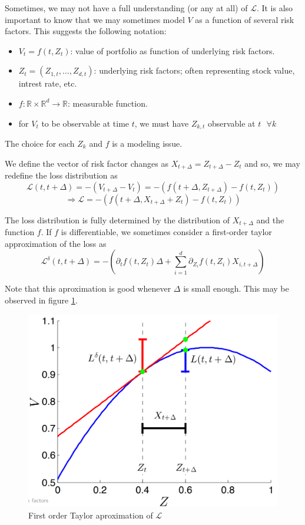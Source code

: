 Sometimes, we may not have a full understanding (or any at all) of $\mathcal{L}$. It is also important to know that we may sometimes model $V$ as a function of
several risk factors. This suggests the following notation:

\begin{itemize}
    \item $V_t = f(t, Z_t)$: value of portfolio as function of underlying risk factors.
    \item $Z_t = (Z_{1,t}, \ldots, Z_{d, t})$: underlying risk factors; often representing stock value, intrest rate, etc.
    \item $f: \mathbb{R} \times \mathbb{R}^d \rightarrow \mathbb{R}$: measurable function.
    \item for $V_t$ to be observable at time $t$, we must have $Z_{k,t}$ observable at $t \text{  } \forall k$
\end{itemize}

The choice for each $Z_k$ and $f$ is a modeling issue.

\begin{definition}
    We define the vector of risk factor changes as $X_{t + \Delta} = Z_{t + \Delta} - Z_t$ and so, we may redefine the loss distribution as
    $$\mathcal{L}(t, t + \Delta) = - \left( V_{t + \Delta} - V_t \right) = - \left( f(t + \Delta, Z_{t + \Delta}) - f(t, Z_t) \right) $$
    $$\Rightarrow \mathcal{L} = - \left( f(t + \Delta, X_{t + \Delta} + Z_t) - f(t, Z_t) \right)$$
\end{definition}

The loss distribution is fully determined by the distribution of $X_{t + \Delta}$ and the function $f$. If $f$ is differentiable, we sometimes consider a first-order taylor approximation of the loss as
$$\mathcal{L}^{\delta}(t, t + \Delta) = - \left( \partial_t f(t, Z_t) \Delta + \sum_{i=1}^{d} \partial_{Z_i} f(t, Z_i)X_{i, t + \Delta} \right)$$

\begin{remark}
    Note that this aproximation is good whenever $\Delta$ is small enough. This may be observed in figure \ref{firstorderaprox}.
\end{remark}

\begin{figure}[htbp]
\centerline{\includegraphics[scale=0.2]{figures/linear_approx_lossdistribution.png}}
\caption{First order Taylor aproximation of $\mathcal{L}$}
\label{firstorderaprox}
\end{figure}